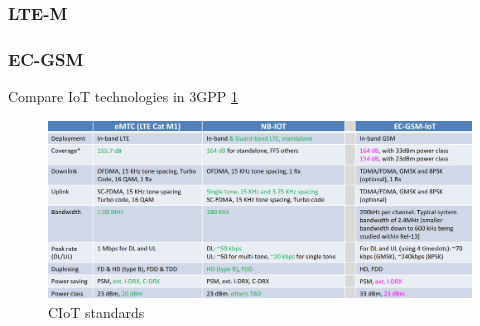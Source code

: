 \documentclass[conference]{IEEEtran}
\begin{document}
\subsubsection{LTE-M}
\label{sec:1-1-2}

\subsubsection{EC-GSM}
\label{sec:1-1-3}

Compare IoT technologies in 3GPP \ref{fig:3gpp_ciot}
\begin{figure}
    \centering
    \includegraphics[width=\linewidth]{Pictures/3GPP CIoT.png}
    \caption{CIoT standards}
    \label{fig:3gpp_ciot}
\end{figure}


\label{sec:1-2}
\end{document}
